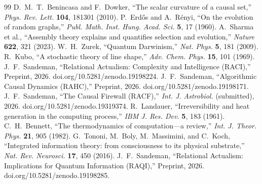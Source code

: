 \documentclass[11pt]{article}
\begin{document}
\begin{thebibliography}{99}
 D.~M.~T.~Benincasa and F.~Dowker, ``The scalar curvature of a causal set,'' \emph{Phys. Rev. Lett.} \textbf{104}, 181301 (2010).
 P.~Erd\H{o}s and A.~R\'enyi, ``On the evolution of random graphs,'' \emph{Publ. Math. Inst. Hung. Acad. Sci.} \textbf{5}, 17 (1960).
 A.~Sharma et al., ``Assembly theory explains and quantifies selection and evolution,'' \emph{Nature} \textbf{622}, 321 (2023).
 W.~H.~Zurek, ``Quantum Darwinism,'' \emph{Nat. Phys.} \textbf{5}, 181 (2009).
 R.~Kubo, ``A stochastic theory of line shape,'' \emph{Adv. Chem. Phys.} \textbf{15}, 101 (1969).
 J.~F.~Sandeman, ``Relational Actualism: Complexity and Intelligence (RACI),'' Preprint, 2026. doi.org/10.5281/zenodo.19198224.
 J.~F.~Sandeman, ``Algorithmic Causal Dynamics (RAHC),'' Preprint, 2026. doi.org/10.5281/zenodo.19198171.
 J.~F.~Sandeman, ``The Causal Firewall (RACF),'' \emph{Int. J. Astrobiol.} (submitted), 2026. doi.org/10.5281/zenodo.19319374.
 R.~Landauer, ``Irreversibility and heat generation in the computing process,'' \emph{IBM J. Res. Dev.} \textbf{5}, 183 (1961).
 C.~H.~Bennett, ``The thermodynamics of computation---a review,'' \emph{Int. J. Theor. Phys.} \textbf{21}, 905 (1982).
 G.~Tononi, M.~Boly, M.~Massimini, and C.~Koch, ``Integrated information theory: from consciousness to its physical substrate,'' \emph{Nat. Rev. Neurosci.} \textbf{17}, 450 (2016).
 J.~F.~Sandeman, ``Relational Actualism: Implications for Quantum Information (RAQI),'' Preprint, 2026. doi.org/10.5281/zenodo.19198285.
\end{thebibliography}
\end{document}

